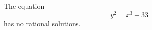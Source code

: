 \begin{proposition}
    The equation
\[
    y^2=x^3-33
\]
    has no rational solutions.
\end{proposition}
